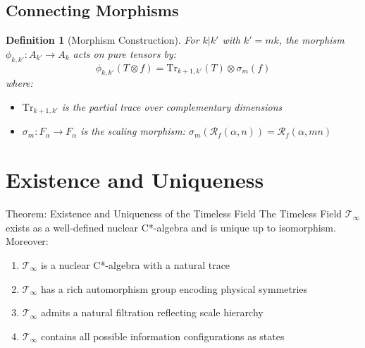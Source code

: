 \documentclass[12pt,letterpaper]{article}
\newcommand{\timelessfield}{\mathcal{T}_\infty}
\newcommand{\fractalres}{\mathcal{R}_f}
\newtheorem{definition}[theorem]{Definition}
\begin{document}
\subsection{Connecting Morphisms}

\begin{definition}[Morphism Construction]
For $k|k'$ with $k' = mk$, the morphism $\phi_{k,k'}: A_{k'} \to A_k$ acts on pure tensors by:
\begin{equation}
\phi_{k,k'}(T \otimes f) = \text{Tr}_{k+1,k'}(T) \otimes \sigma_m(f)
\end{equation}
where:
\begin{itemize}
\item $\text{Tr}_{k+1,k'}$ is the partial trace over complementary dimensions
\item $\sigma_m: F_\alpha \to F_\alpha$ is the scaling morphism: $\sigma_m(\fractalres(\alpha, n)) = \fractalres(\alpha, mn)$
\end{itemize}
\end{definition}

\section{Existence and Uniqueness}

\begin{mathbox}{Theorem: Existence and Uniqueness of the Timeless Field}
The Timeless Field $\timelessfield$ exists as a well-defined nuclear C*-algebra and is unique up to isomorphism. Moreover:
\begin{enumerate}
\item $\timelessfield$ is a nuclear C*-algebra with a natural trace
\item $\timelessfield$ has a rich automorphism group encoding physical symmetries
\item $\timelessfield$ admits a natural filtration reflecting scale hierarchy
\item $\timelessfield$ contains all possible information configurations as states
\end{enumerate}
\end{mathbox}
\end{document}

